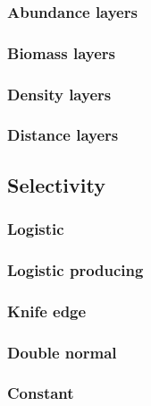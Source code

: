 \subsubsection{Abundance layers}

\subsubsection{Biomass layers}

\subsubsection{Density layers}

\subsubsection{Distance layers}

\subsection{Selectivity}

\subsubsection{Logistic}

\subsubsection{Logistic producing}

\subsubsection{Knife edge}

\subsubsection{Double normal}

\subsubsection{Constant}


